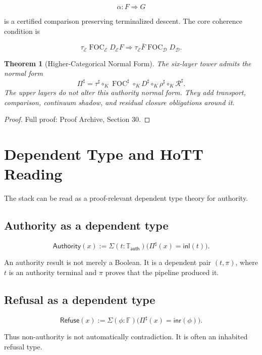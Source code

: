 \documentclass[11pt]{article}
\newtheorem{theorem}{Theorem}[section]
\begin{document}
\[
\alpha:F\Rightarrow G
\]

is a certified comparison preserving terminalized descent. The core coherence condition is

\[
\boxed{
\tau_{\mathcal E}\operatorname{FOC}_{\mathcal E}D_{\mathcal E}F
\Rightarrow
\tau_{\mathcal E}\bar F\operatorname{FOC}_{\mathcal D}D_{\mathcal D}.
}
\]

\begin{theorem}[Higher-Categorical Normal Form] \label{thm:hcnf}
The six-layer tower admits the normal form
\[
\boxed{
\Pi^\sharp
=
\tau^\sharp\circ_K \operatorname{FOC}^\sharp\circ_K D^\sharp\circ_K \rho^\sharp\circ_K \mathcal R^\sharp.
}
\]
The upper layers do not alter this authority normal form. They add transport, comparison, continuum shadow, and residual closure obligations around it.
\end{theorem}

\begin{proof}
Full proof: Proof Archive, Section 30.
\end{proof}

\section{Dependent Type and HoTT Reading}

The stack can be read as a proof-relevant dependent type theory for authority.

\subsection{Authority as a dependent type}

\[
\boxed{
\mathsf{Authority}(x)
:=
\Sigma(t:\mathbb T_{\mathsf{auth}})\bigl(\Pi^\sharp(x)=\mathsf{inl}(t)\bigr).
}
\]

An authority result is not merely a Boolean. It is a dependent pair \((t,\pi)\), where \(t\) is an authority terminal and \(\pi\) proves that the pipeline produced it.

\subsection{Refusal as a dependent type}

\[
\boxed{
\mathsf{Refuse}(x)
:=
\Sigma(\phi:\mathbb F)\bigl(\Pi^\sharp(x)=\mathsf{inr}(\phi)\bigr).
}
\]

Thus non-authority is not automatically contradiction. It is often an inhabited refusal type.
\end{document}
